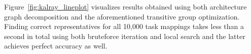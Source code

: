 Figure~\ref{fig:kalray_lineplot} visualizes results obtained using both
architecture graph decomposition and the aforementioned transitive group
optimization. Finding correct representatives for all 10,000 task mappings
takes less than a second in total using both bruteforce iteration and local
search and the latter achieves perfect accuracy as well.
